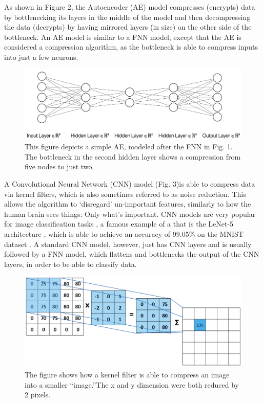 \documentclass[conference]{IEEEtran}
\begin{document}
As shown in Figure 2, the Autoencoder (AE)\cite{Bank} model compresses (encrypts) data by bottlenecking its layers in the middle of the model and then decompressing the data (decrypts) by having mirrored layers (in size) on the other side of the bottleneck. An AE model is similar to a FNN model, except that the AE is considered a compression algorithm, as the bottleneck is able to compress inputs into just a few neurons.


\begin{figure}[htbp]
\centerline{\includegraphics[scale=0.28]{AE Visualized}}
\caption{This figure depicts a simple AE, modeled after the FNN in Fig. 1. The bottleneck in the second hidden layer shows a compression from five nodes to just two.}
\label{fig}
\end{figure}

\newpage
A Convolutional Neural Network (CNN)\cite{Fukushima} model (Fig. 3)is able to compress data via kernel filters\cite{Sheikholeslami}\cite{Connault}, which is also sometimes referred to as noise reduction\cite{Garnett}. This allows the algorithm to ‘disregard’ un-important features\cite{Tomasi}, similarly to how the human brain sees things: Only what's important\cite{Hoffman}. CNN models are very popular for image classification tasks \cite{Sultana}, a famous example of a that is the LeNet-5 architecture \cite{LeCun:1}, which is able to achieve an accuracy of 99.05\% on the MNIST dataset \cite{LeCun:2}. A standard CNN model, however, just has CNN layers and is usually followed by a FNN model, which flattens and bottlenecks the output of the CNN layers, in order to be able to classify data.


\begin{figure}[htbp]
\centerline{\includegraphics[scale=0.38]{CNN Visualized}}
\caption{The figure shows how a kernel filter is able to compress an image into a smaller “image.”The x and y dimension were both reduced by 2 pixels.}
\label{fig}
\end{figure}
\end{document}
